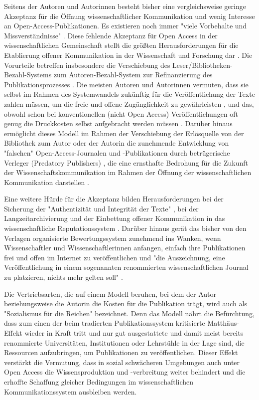 Seitens der Autoren und Autorinnen besteht bisher eine vergleichsweise geringe Akzeptanz für die Öffnung wissenschaftlicher Kommunikation und wenig Interesse an Open-Access-Publikationen. Es existieren noch immer "viele Vorbehalte und Missverständnisse" \cite{Suber_2002}. Diese fehlende Akzeptanz für Open Access in der wissenschaftlichen Gemeinschaft stellt die größten Herausforderungen für die Etablierung offener Kommunikation in der Wissenschaft und Forschung dar \cite{Weishaupt_2009}. Die Vorurteile betreffen insbesondere die Verschiebung des Leser/Bibliotheken-Bezahl-Systems zum Autoren-Bezahl-System zur Refinanzierung des Publikationsprozesses \cite{European_Commission_2006} \cite{Chibnik_2015}. Die meisten Autoren und Autorinnen vermuten, dass sie selbst im Rahmen des Systemwandels zukünftig für die Veröffentlichung der Texte zahlen müssen, um die freie und offene Zugänglichkeit zu gewährleisten \cite{Mussell_2013}, und das, obwohl schon bei konventionellen (nicht Open Access) Veröffentlichungen oft genug die Druckkosten selbst aufgebracht werden müssen \cite{Weishaupt_2009}. Darüber hinaus ermöglicht dieses Modell im Rahmen der Verschiebung der Erlösquelle von der Bibliothek zum Autor oder der Autorin die zunehmende Entwicklung von "falschen" Open-Access-Journalen und -Publikationen durch betrügerische Verleger (Predatory Publishers) \cite{Beall_2015}, die eine ernsthafte Bedrohung für die Zukunft der Wissenschaftskommunikation im Rahmen der Öffnung der wissenschaftlichen Kommunikation darstellen \cite{Beall_2012}.

Eine weitere Hürde für die Akzeptanz bilden Herausforderungen bei der Sicherung der "Authentizität und Integrität der Texte" \cite{Weishaupt_2009} \cite[:191]{Fehling_2014}, bei der Langzeitarchivierung \cite{Hagner_2015} \cite{Eve_2014} und der Einbettung offener Kommunikation in das wissenschaftliche Reputationssystem \cite{Weishaupt_2009} \cite{Suber_2002} \cite{Adema_2014}. Darüber hinaus gerät das bisher von den Verlagen organisierte Bewertungssystem zunehmend ins Wanken, wenn Wissenschaftler und Wissenschaftlerinnen anfangen, einfach ihre Publikationen frei und offen im Internet zu veröffentlichen und "die Auszeichnung, eine Veröffentlichung in einem sogenannten renommierten wissenschaftlichen Journal zu platzieren, nichts mehr gelten soll" \cite[:24]{Schirmbacher_2007}.

Die Vertriebsarten, die auf einem Modell beruhen, bei dem der Autor beziehungsweise die Autorin die Kosten für die Publikation trägt, wird auch als "Sozialismus für die Reichen" \cite{Cope_2014} bezeichnet. Denn das Modell nährt die Befürchtung, dass zum einen der beim tradierten Publikationssystem kritisierte Matthäus-Effekt wieder in Kraft tritt und nur gut ausgestattete und damit meist bereits renommierte Universitäten, Institutionen oder Lehrstühle in der Lage sind, die Ressourcen aufzubringen, um Publikationen zu veröffentlichen. Dieser Effekt verstärkt die Vermutung, dass in sozial schwächeren Umgebungen auch unter Open Access die Wissensproduktion und -verbreitung weiter behindert und die erhoffte Schaffung gleicher Bedingungen im wissenschaftlichen Kommunikationssystem ausbleiben werden.

